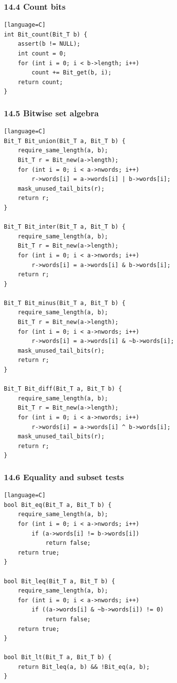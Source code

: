 \documentclass[11pt]{article}
\begin{document}
\subsubsection{14.4 Count bits}\label{count-bits}

\begin{verbatim}[language=C]
int Bit_count(Bit_T b) {
    assert(b != NULL);
    int count = 0;
    for (int i = 0; i < b->length; i++)
        count += Bit_get(b, i);
    return count;
}
\end{verbatim}

\subsubsection{14.5 Bitwise set algebra}\label{bitwise-set-algebra}

\begin{verbatim}[language=C]
Bit_T Bit_union(Bit_T a, Bit_T b) {
    require_same_length(a, b);
    Bit_T r = Bit_new(a->length);
    for (int i = 0; i < a->nwords; i++)
        r->words[i] = a->words[i] | b->words[i];
    mask_unused_tail_bits(r);
    return r;
}

Bit_T Bit_inter(Bit_T a, Bit_T b) {
    require_same_length(a, b);
    Bit_T r = Bit_new(a->length);
    for (int i = 0; i < a->nwords; i++)
        r->words[i] = a->words[i] & b->words[i];
    return r;
}

Bit_T Bit_minus(Bit_T a, Bit_T b) {
    require_same_length(a, b);
    Bit_T r = Bit_new(a->length);
    for (int i = 0; i < a->nwords; i++)
        r->words[i] = a->words[i] & ~b->words[i];
    mask_unused_tail_bits(r);
    return r;
}

Bit_T Bit_diff(Bit_T a, Bit_T b) {
    require_same_length(a, b);
    Bit_T r = Bit_new(a->length);
    for (int i = 0; i < a->nwords; i++)
        r->words[i] = a->words[i] ^ b->words[i];
    mask_unused_tail_bits(r);
    return r;
}
\end{verbatim}

\subsubsection{14.6 Equality and subset tests}\label{equality-and-subset-tests}

\begin{verbatim}[language=C]
bool Bit_eq(Bit_T a, Bit_T b) {
    require_same_length(a, b);
    for (int i = 0; i < a->nwords; i++)
        if (a->words[i] != b->words[i])
            return false;
    return true;
}

bool Bit_leq(Bit_T a, Bit_T b) {
    require_same_length(a, b);
    for (int i = 0; i < a->nwords; i++)
        if ((a->words[i] & ~b->words[i]) != 0)
            return false;
    return true;
}

bool Bit_lt(Bit_T a, Bit_T b) {
    return Bit_leq(a, b) && !Bit_eq(a, b);
}
\end{verbatim}
\end{document}
